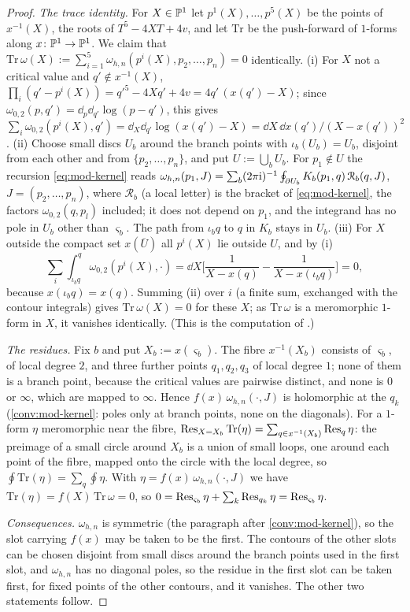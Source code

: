 \begin{proof}
\emph{The trace identity.} For $X\in\mathbb{P}^1$ let $p^1(X),\dots,p^5(X)$ be the points of $x^{-1}(X)$, the roots of $T^5-4XT+4v$, and let $\mathrm{Tr}$ be the push-forward of $1$-forms along $x\colon\mathbb{P}^1\to\mathbb{P}^1$. We claim that $\mathrm{Tr}\,\omega(X):=\sum_{i=1}^5\omega_{h,n}(p^i(X),p_2,\dots,p_n)=0$ identically. (i) For $X$ not a critical value and $q'\notin x^{-1}(X)$, $\prod_i(q'-p^i(X))=q'^5-4Xq'+4v=4q'\,(x(q')-X)$; since $\omega_{0,2}(p,q')=\dd_p\dd_{q'}\log(p-q')$, this gives $\sum_i\omega_{0,2}(p^i(X),q')=\dd_X\dd_{q'}\log(x(q')-X)=\dd X\,\dd x(q')/(X-x(q'))^2$. (ii) Choose small discs $U_b$ around the branch points with $\iota_b(U_b)=U_b$, disjoint from each other and from $\{p_2,\dots,p_n\}$, and put $U:=\bigcup_bU_b$. For $p_1\notin U$ the recursion \eqref{eq:mod-kernel} reads $\omega_{h,n}(p_1,J)=\sum_b(2\pi\mathrm{i})^{-1}\oint_{\partial U_b}K_b(p_1,q)\,\mathcal R_b(q,J)$, $J=(p_2,\dots,p_n)$, where $\mathcal R_b$ (a local letter) is the bracket of \eqref{eq:mod-kernel}, the factors $\omega_{0,2}(q,p_l)$ included; it does not depend on $p_1$, and the integrand has no pole in $U_b$ other than $\varsigma_b$. The path from $\iota_bq$ to $q$ in $K_b$ stays in $U_b$. (iii) For $X$ outside the compact set $x(\overline U)$ all $p^i(X)$ lie outside $U$, and by (i)
\[
\sum_i\int_{\iota_bq}^q\omega_{0,2}(p^i(X),\cdot)=\dd X\Big[\frac{1}{X-x(q)}-\frac{1}{X-x(\iota_bq)}\Big]=0,
\]
because $x(\iota_bq)=x(q)$. Summing (ii) over $i$ (a finite sum, exchanged with the contour integrals) gives $\mathrm{Tr}\,\omega(X)=0$ for these $X$; as $\mathrm{Tr}\,\omega$ is a meromorphic $1$-form in $X$, it vanishes identically. (This is the computation of \cite[App.~A, (A-1), (A-5)]{Eynard:2007kz}.)

\emph{The residues.} Fix $b$ and put $X_b:=x(\varsigma_b)$. The fibre $x^{-1}(X_b)$ consists of $\varsigma_b$, of local degree $2$, and three further points $q_1,q_2,q_3$ of local degree $1$; none of them is a branch point, because the critical values are pairwise distinct, and none is $0$ or $\infty$, which are mapped to $\infty$. Hence $f(x)\,\omega_{h,n}(\cdot,J)$ is holomorphic at the $q_k$ (\cref{conv:mod-kernel}: poles only at branch points, none on the diagonals). For a $1$-form $\eta$ meromorphic near the fibre, $\operatorname*{Res}_{X=X_b}\mathrm{Tr}(\eta)=\sum_{q\in x^{-1}(X_b)}\operatorname*{Res}_q\eta$: the preimage of a small circle around $X_b$ is a union of small loops, one around each point of the fibre, mapped onto the circle with the local degree, so $\oint\mathrm{Tr}(\eta)=\sum_q\oint\eta$. With $\eta=f(x)\,\omega_{h,n}(\cdot,J)$ we have $\mathrm{Tr}(\eta)=f(X)\,\mathrm{Tr}\,\omega=0$, so $0=\operatorname*{Res}_{\varsigma_b}\eta+\sum_k\operatorname*{Res}_{q_k}\eta=\operatorname*{Res}_{\varsigma_b}\eta$.

\emph{Consequences.} $\omega_{h,n}$ is symmetric (the paragraph after \cref{conv:mod-kernel}), so the slot carrying $f(x)$ may be taken to be the first. The contours of the other slots can be chosen disjoint from small discs around the branch points used in the first slot, and $\omega_{h,n}$ has no diagonal poles, so the residue in the first slot can be taken first, for fixed points of the other contours, and it vanishes. The other two statements follow.
\end{proof}

